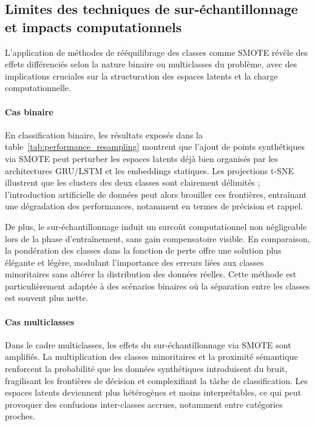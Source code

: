 \documentclass[12pt]{report}
\begin{document}
\subsection{Limites des techniques de sur-échantillonnage et impacts computationnels}

L’application de méthodes de rééquilibrage des classes comme SMOTE révèle des effets différenciés selon la nature binaire ou multiclasses du problème, avec des implications cruciales sur la structuration des espaces latents et la charge computationnelle.

\paragraph{Cas binaire}

En classification binaire, les résultats exposés dans la table~\ref{tab:performance_resampling} montrent que l’ajout de points synthétiques via SMOTE peut perturber les espaces latents déjà bien organisés par les architectures GRU/LSTM et les embeddings statiques. Les projections t-SNE illustrent que les clusters des deux classes sont clairement délimités ; l’introduction artificielle de données peut alors brouiller ces frontières, entraînant une dégradation des performances, notamment en termes de précision et rappel.

De plus, le sur-échantillonnage induit un surcoût computationnel non négligeable lors de la phase d’entraînement, sans gain compensatoire visible. En comparaison, la pondération des classes dans la fonction de perte offre une solution plus élégante et légère, modulant l’importance des erreurs liées aux classes minoritaires sans altérer la distribution des données réelles. Cette méthode est particulièrement adaptée à des scénarios binaires où la séparation entre les classes est souvent plus nette.

\paragraph{Cas multiclasses}

Dans le cadre multiclasses, les effets du sur-échantillonnage via SMOTE sont amplifiés. La multiplication des classes minoritaires et la proximité sémantique renforcent la probabilité que les données synthétiques introduisent du bruit, fragilisant les frontières de décision et complexifiant la tâche de classification. Les espaces latents deviennent plus hétérogènes et moins interprétables, ce qui peut provoquer des confusions inter-classes accrues, notamment entre catégories proches.
\end{document}
